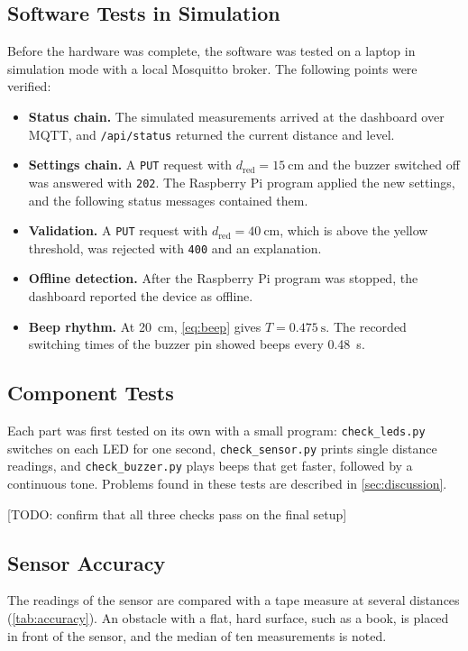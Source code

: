 \documentclass[11pt,a4paper]{article}
\newcommand{\todo}[1]{\textcolor{red!75!black}{[TODO: #1]}}
\begin{document}
\subsection{Software Tests in Simulation}
Before the hardware was complete, the software was tested on a laptop in
simulation mode with a local Mosquitto broker. The following points were
verified:
\begin{itemize}
  \item \textbf{Status chain.} The simulated measurements arrived at the
        dashboard over MQTT, and \texttt{/api/status} returned the current
        distance and level.
  \item \textbf{Settings chain.} A \texttt{PUT} request with
        $d_\text{red} = \qty{15}{\centi\metre}$ and the buzzer switched off was
        answered with \texttt{202}. The Raspberry Pi program applied the new
        settings, and the following status messages contained them.
  \item \textbf{Validation.} A \texttt{PUT} request with
        $d_\text{red} = \qty{40}{\centi\metre}$, which is above the yellow
        threshold, was rejected with \texttt{400} and an explanation.
  \item \textbf{Offline detection.} After the Raspberry Pi program was stopped,
        the dashboard reported the device as offline.
  \item \textbf{Beep rhythm.} At \qty{20}{\centi\metre}, \cref{eq:beep} gives
        $T = \qty{0.475}{\second}$. The recorded switching times of the buzzer
        pin showed beeps every \qty{0.48}{\second}.
\end{itemize}

\subsection{Component Tests}
Each part was first tested on its own with a small program:
\texttt{check\_leds.py} switches on each LED for one second,
\texttt{check\_sensor.py} prints single distance readings, and
\texttt{check\_buzzer.py} plays beeps that get faster, followed by a continuous
tone. Problems found in these tests are described in \cref{sec:discussion}.

\todo{confirm that all three checks pass on the final setup}

\subsection{Sensor Accuracy}
The readings of the sensor are compared with a tape measure at several distances
(\cref{tab:accuracy}). An obstacle with a flat, hard surface, such as a book, is
placed in front of the sensor, and the median of ten measurements is noted.
\end{document}
